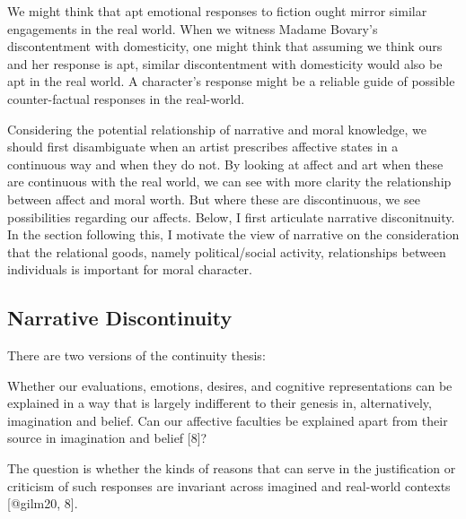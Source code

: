 \documentclass[12pt]{book}
\theoremstyle{definition}
\theoremstyle{remark}
\newcommand{\NormalTok}[1]{#1}
\newenvironment{Shaded}{}{}
\newenvironment{Highlighting}{}{}
\begin{document}
We might think that apt emotional responses to fiction ought mirror similar engagements in the real world. When we witness Madame Bovary's discontentment with domesticity, one might think that assuming we think ours and her response is apt, similar discontentment with domesticity would also be apt in the real world. A character's response might be a reliable guide of possible counter-factual responses in the real-world.

Considering the potential relationship of narrative and moral knowledge, we should first disambiguate when an artist prescribes affective states in a continuous way and when they do not. By looking at affect and art when these are continuous with the real world, we can see with more clarity the relationship between affect and moral worth. But where these are discontinuous, we see possibilities regarding our affects. Below, I first articulate narrative disconitnuity. In the section following this, I motivate the view of narrative on the consideration that the relational goods, namely political/social activity, relationships between individuals is important for moral character.

\subsection*{Narrative Discontinuity}\label{narrative-discontinuity}

There are two versions of the continuity thesis:

\begin{Shaded}
\begin{Highlighting}[]

\NormalTok{Whether our evaluations, emotions, desires, and cognitive representations can be explained in a way that is largely indifferent to their genesis in, alternatively, imagination and belief. Can our affective faculties be explained apart from their source in imagination and belief [8]?}
\end{Highlighting}
\end{Shaded}

\begin{Shaded}
\begin{Highlighting}[]

\NormalTok{The question is whether the kinds of reasons that can serve in the justification or criticism of such responses are invariant across imagined and real{-}world contexts [@gilm20, 8].}
\end{Highlighting}
\end{Shaded}
\end{document}
